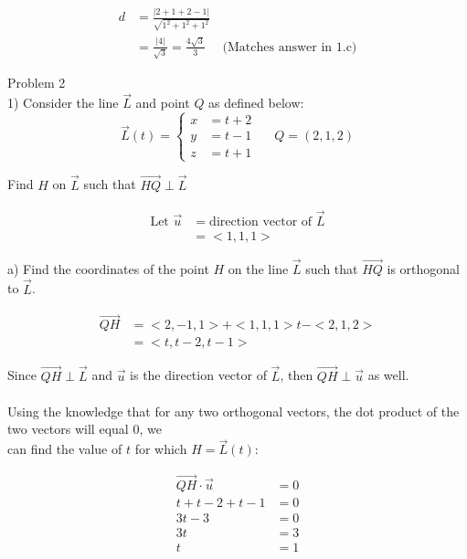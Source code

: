 \documentclass{article}
\begin{document}
\begin{align*}
d &= \frac{| 2 + 1 + 2 - 1 |}{\sqrt{1^2 + 1^2 + 1^2}} \\
&= \frac{| 4 |}{\sqrt{3}} = \frac{4\sqrt{3}}{3} \quad \text{ (Matches answer in 1.c)}
\end{align*}



\begin{text}
Problem 2 \\

1) Consider the line $\vec{L}$ and point $Q$ as defined below:
\[\vec{L}(t) = \left\{
  \begin{array}{lr}
    x &= t + 2 \\
    y &= t - 1 \\
    z &= t + 1
  \end{array}
\right.
\;\;\;\;\;
Q = (2,1,2)
\]

\indent\indent Find $H$ on $\vec{L}$ such that $\vec{HQ} \perp \vec{L}$
\end{text}

\begin{align*}
\text{Let } \vec{u} &= \text{direction vector of } \vec{L} \\
&= <1,1,1>
\end{align*}

\begin{text}
\indent a) Find the coordinates of the point $H$ on the line $\vec{L}$ such that $\vec{HQ}$ is orthogonal to $\vec{L}$.
\end{text}

\begin{align*}
\vec{QH} &= <2, -1, 1> + <1,1,1>t - <2,1,2> \\
         &= <t, t-2, t-1>
\end{align*}

\begin{text}
\indent\indent Since $\vec{QH} \perp \vec{L}$ and $\vec{u}$ is the direction vector of $\vec{L}$, then $\vec{QH} \perp \vec{u}$ as well. \\ \\
\indent\indent\indent Using the knowledge that for any two orthogonal vectors, the dot product of the two vectors will equal $0$, we \\
\indent\indent\indent can find the value of $t$ for which $H = \vec{L}(t)$:
\end{text}

\begin{align*}
\vec{QH} \cdot \vec{u} &= 0\\
t + t - 2 + t -1 &= 0 \\
3t - 3 &= 0 \\
3t &= 3 \\
t &= 1
\end{align*}
\end{document}
